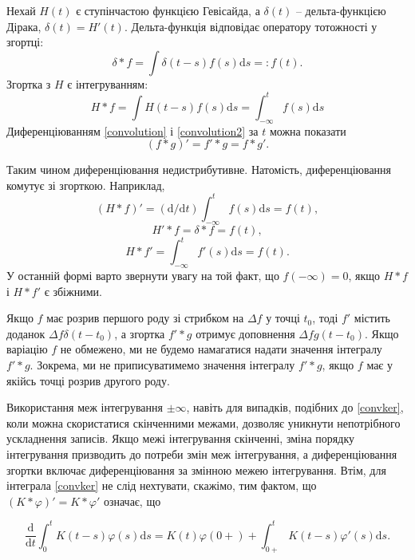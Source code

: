 \documentclass[14pt,twoside]{extreport}
\theoremstyle{mystyle}
\numberwithin{equation}{chapter}
\begin{document}
Нехай $H(t)$ є ступінчастою функцією Гевісайда, а $\delta(t)$ -- дельта-функцією Дірака, $\delta(t)=H'(t)$. Дельта-функція відповідає оператору тотожності у згортці:
\begin{equation*}
	\displaystyle \delta*f=\int\delta(t-s)f(s)\mathrm{d}s=:f(t).
\end{equation*}
Згортка з $H$ є інтегруванням:
\begin{equation*}
	H*f=\displaystyle \int H(t-s)f(s)\mathrm{d}s=\int_{-\infty}^{t}f(s)\mathrm{d}s
\end{equation*}
Диференціюванням \eqref{convolution} і \eqref{convolution2} за $t$ можна показати
\begin{equation*}
	(f*g)'=f'*g=f*g'.
\end{equation*}

Таким чином диференціювання недистрибутивне. Натомість, диференціювання комутує зі згорткою. Наприклад,
\begin{equation*}
	(H*f)'=(\mathrm{d}/\mathrm{d}t)\displaystyle \int_{-\infty}^{t}f(s)\mathrm{d}s=f(t),
\end{equation*}
\begin{equation*}	
	H'*f=\delta*f=f(t),
\end{equation*}
\begin{equation*}
	H*f'=\displaystyle \int_{-\infty}^{t}f'(s)\mathrm{d}s=f(t).
\end{equation*}
У останній формі варто звернути увагу на той факт, що $f(-\infty)=0$, якщо $H*f$ і $H*f'$ є збіжними.

Якщо $f$ має розрив першого роду зі стрибком на $\Delta f$ у точці $t_{0}$, тоді $f'$ містить доданок $\Delta f\delta(t-t_{0})$, а згортка $f'*g$ отримує доповнення $\Delta fg(t-t_{0})$. Якщо варіацію $f$ не обмежено, ми не будемо намагатися надати значення інтегралу $f'*g$. Зокрема, ми не приписуватимемо значення інтегралу $f'*g$, якщо $f$ має у якійсь точці розрив другого роду.

Використання меж інтегрування $\pm\infty$, навіть для випадків, подібних до \eqref{convker}, коли можна скористатися скінченними межами, дозволяє уникнути непотрібного ускладнення записів. Якщо межі інтегрування скінченні, зміна порядку інтегрування призводить до потреби змін меж інтегрування, а диференціювання згортки включає диференціювання за змінною межею інтегрування. Втім, для інтеграла \eqref{convker} не слід нехтувати, скажімо, тим фактом, що $(K*\varphi)'=K*\varphi'$ означає, що

\begin{equation*}
\frac{\mathrm{d}}{\mathrm{d}t}\displaystyle \int_{0}^{t}K(t-s)\varphi(s)\mathrm{d}s=K(t)\varphi(0+)+\int_{0+}^{t}K(t-s)\varphi'(s)\mathrm{d}s.
\end{equation*}
\end{document}
